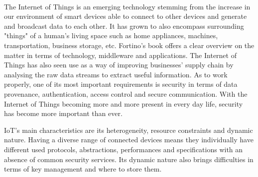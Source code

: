 \documentclass[14]{article}
\begin{document}
\author{\textbf{Faculty of Sciences and Bio-Engineering Sciences}\\[2\baselineskip]\newline\textbf{Arthur Chomé}}

\date{ \LARGE Security within the Internet Of things: \break A Literature Review}
\title{\vspace{-2cm}}%

\maketitle\mbox{}\\

The Internet of Things is an emerging technology\cite{atzori2010internet} stemming from the increase in our environment of smart devices able to connect to other devices and generate and broadcast data to each other. It has grown to also encompass surrounding "things" of a human’s living space such as home appliances, machines, transportation, business storage, etc. Fortino's book\cite{fortino2014internet} offers a clear overview on the matter in terms of technology, middleware and applications. The Internet of Things has also seen use as a way of improving businesses' supply chain\cite{ben2019internet} by analysing the raw data streams to extract useful information. As to work properly, one of its most important requirements is security in terms of data provenance, authentication, access control and secure communication. With the Internet of Things becoming more and more present in every day life, security has become more important than ever. 
\newline

IoT's main characteristics\cite{oh2017security} are its heterogeneity, resource constraints and dynamic nature. Having a diverse range of connected devices means they individually have different used protocols\cite{sethi2017internet}, abstractions, performances and specifications with an absence of common security services. Its dynamic nature also brings difficulties in terms of key management and where to store them.
\end{document}
